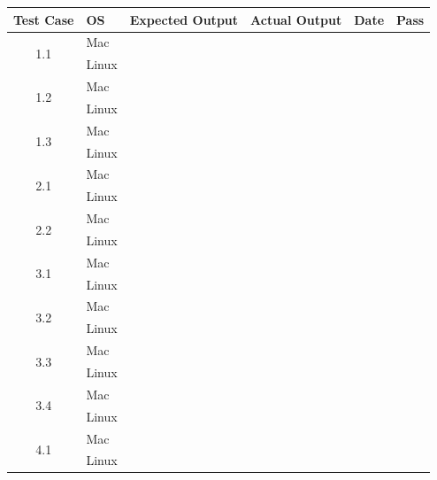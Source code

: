 \documentclass[a4paper, 12pt]{article}
\newcommand{\cmark}{\ding{51}}%
\newcommand{\xmark}{\ding{55}}%
\begin{document}
\begin{tabular}{| c | l | l | l | l | c |}
\hline

Test Case 				& OS			& Expected Output			& Actual Output		& Date			& Pass		\\ \hline
\multirow{2}{*}{1.1}	& Mac		&									&							&					&	\cmark			\\ \cline{2-6}
							& Linux		&									&							&					& \xmark				\\ \hline
\multirow{2}{*}{1.2}	& Mac		&									&							&					&				\\ \cline{2-6}
							& Linux		&									&							&					&				\\ \hline
\multirow{2}{*}{1.3}	& Mac		&									&							&					&				\\ \cline{2-6}
							& Linux		&									&							&					&				\\ \hline
\multirow{2}{*}{2.1}	& Mac		&									&							&					&				\\ \cline{2-6}
							& Linux		&									&							&					&				\\ \hline
\multirow{2}{*}{2.2}	& Mac		&									&							&					&				\\ \cline{2-6}
							& Linux		&									&							&					&				\\ \hline
\multirow{2}{*}{3.1}	& Mac		&									&							&					&				\\ \cline{2-6}
							& Linux		&									&							&					&				\\ \hline
\multirow{2}{*}{3.2}	& Mac		&									&							&					&				\\ \cline{2-6}
							& Linux		&									&							&					&				\\ \hline
\multirow{2}{*}{3.3}	& Mac		&									&							&					&				\\ \cline{2-6}
							& Linux		&									&							&					&				\\ \hline
\multirow{2}{*}{3.4}	& Mac		&									&							&					&				\\ \cline{2-6}
							& Linux		&									&							&					&				\\ \hline
\multirow{2}{*}{4.1}	& Mac		&									&							&					&				\\ \cline{2-6}
							& Linux		&									&							&					&				\\ \hline


\end{tabular}
\newpage
\end{document}
